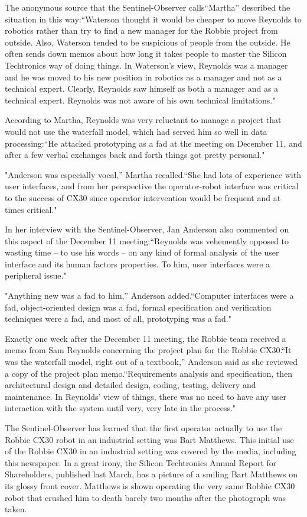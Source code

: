 The anonymous source that the Sentinel-Observer calls``Martha'' described the situation in this way:``Waterson thought it would be cheaper to move Reynolds to robotics rather than try to find a new manager for the Robbie project from outside. Also, Waterson tended to be suspicious of people from the outside. He often sends down memos about how long it takes people to master the Silicon Techtronics way of doing things. In Waterson's view, Reynolds was a manager and he was moved to his new position in robotics as a manager and not as a technical expert. Clearly, Reynolds saw himself as both a manager and as a technical expert. Reynolds was not aware of his own technical limitations."

According to Martha, Reynolds was very reluctant to manage a project that would not use the waterfall model, which had served him so well in data processing:``He attacked prototyping as a fad at the meeting on December 11, and after a few verbal exchanges back and forth things got pretty personal."

"Anderson was especially vocal,'' Martha recalled.``She had lots of experience with user interfaces, and from her perspective the operator-robot interface was critical to the success of CX30 since operator intervention would be frequent and at times critical."

In her interview with the Sentinel-Observer, Jan Anderson also commented on this aspect of the December 11 meeting:``Reynolds was vehemently opposed to wasting time -- to use his words -- on any kind of formal analysis of the user interface and its human factors properties. To him, user interfaces were a peripheral issue."

"Anything new was a fad to him,'' Anderson added.``Computer interfaces were a fad, object-oriented design was a fad, formal specification and verification techniques were a fad, and most of all, prototyping was a fad."

Exactly one week after the December 11 meeting, the Robbie team received a memo from Sam Reynolds concerning the project plan for the Robbie CX30.``It was the waterfall model, right out of a textbook,'' Anderson said as she reviewed a copy of the project plan memo.``Requirements analysis and specification, then architectural design and detailed design, coding, testing, delivery and maintenance. In Reynolds' view of things, there was no need to have any user interaction with the system until very, very late in the process."

The Sentinel-Observer has learned that the first operator actually to use the Robbie CX30 robot in an industrial setting was Bart Matthews. This initial use of the Robbie CX30 in an industrial setting was covered by the media, including this newspaper. In a great irony, the Silicon Techtronics Annual Report for Shareholders, published last March, has a picture of a smiling Bart Matthews on its glossy front cover. Matthews is shown operating the very same Robbie CX30 robot that crushed him to death barely two months after the photograph was taken.
